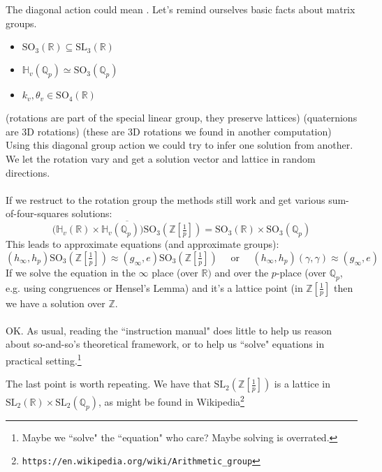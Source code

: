 \documentclass[12pt]{article}
\begin{document}
{The diagonal action could mean .  Let's remind ourselves basic facts about matrix groups.
\begin{itemize}
\item $\text{SO}_3(\mathbb{R}) \subseteq \text{SL}_3(\mathbb{R}) $ 
\item $\mathbb{H}_v(\mathbb{Q}_p) \simeq \text{SO}_3(\mathbb{Q}_p)$ 
\item $k_v, \theta_v \in \text{SO}_4(\mathbb{R})$ 
\end{itemize}
(rotations are part of the special linear group, they preserve lattices) (quaternions are 3D rotations) (these are 3D rotations we found  in another computation)  Using this diagonal group action we could try to infer one solution from another.  We let the rotation vary and get a solution vector and lattice in random directions. \\ \\
If we restruct to the rotation group the methods still work and get various sum-of-four-squares solutions:
$$\overline{ \big(\mathbb{H}_v(\mathbb{R}) \times \mathbb{H}_v(\mathbb{Q}_p)\big) \text{SO}_3(\mathbb{Z}[\tfrac{1}{p}]) }  = \text{SO}_3(\mathbb{R}) \times \text{SO}_3(\mathbb{Q}_p) $$
This leads to approximate equations (and approximate groups):
$$  (h_\infty, h_p) \text{SO}_3(\mathbb{Z}[\tfrac{1}{p}]) \approx (g_\infty, e)\text{SO}_3(\mathbb{Z}[\tfrac{1}{p}]) \quad\text{ or }\quad
(h_\infty, h_p) (\gamma, \gamma) \approx (g_\infty, e)$$
If we solve the equation in the $\infty$ place (over $\mathbb{R})$ and over the $p$-place 
(over $\mathbb{Q}_p$, e.g. using congruences or Hensel's Lemma) and it's a lattice point (in $\mathbb{Z}[\frac{1}{p}]$ then we have a solution over $\mathbb{Z}$. \\ \\
OK.  As usual, reading the ``instruction manual" does little to help us reason about so-and-so's theoretical framework, or to help us ``solve" equations in practical setting.\footnote{Maybe we ``solve" the ``equation" who care?  Maybe solving is overrated.}
}

\newpage

 The last point is worth repeating.  We have that $\text{SL}_2(\mathbb{Z}[\frac{1}{p}])$ is a lattice in $\text{SL}_2(\mathbb{R}) \times \text{SL}_2(\mathbb{Q}_p)$, as might be found in Wikipedia\footnote{\texttt{https://en.wikipedia.org/wiki/Arithmetic\_{}group}}
\end{document}
